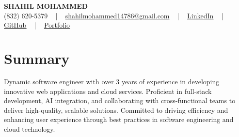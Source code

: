 \documentclass[letterpaper,10pt]{article}
\begin{document}
\begin{center}
    {\fontsize{14pt}{12pt}\selectfont \textbf{\MakeUppercase{Shahil Mohammed}}}\\ \vspace{2pt}
    \fontsize{10pt}{12pt}\selectfont (832) 620-5379 ~ | ~ \href{mailto:shahilmohammed14786@gmail.com}{shahilmohammed14786@gmail.com} ~ | ~  
    \href{https://www.linkedin.com/in/shahil-mohammed-9652931a1/}{\color{blue}\underline{LinkedIn}}  ~ | ~ 
    \href{https://github.com/freakbeast14}{\color{blue}\underline{GitHub}} ~ | ~ 
    \href{https://shahil-mohammed.netlify.app/}{\color{blue}\underline{Portfolio}}
    \vspace{-8pt}
\end{center}

\section{Summary}
\vspace{-2pt}\fontsize{8pt}{9pt}\selectfont
Dynamic software engineer with over 3 years of experience in developing innovative web applications and cloud services. Proficient in full-stack development, AI integration, and collaborating with cross-functional teams to deliver high-quality, scalable solutions. Committed to driving efficiency and enhancing user experience through best practices in software engineering and cloud technology.
 \vspace{-5pt}
 
\vspace{-2pt}
\end{document}
